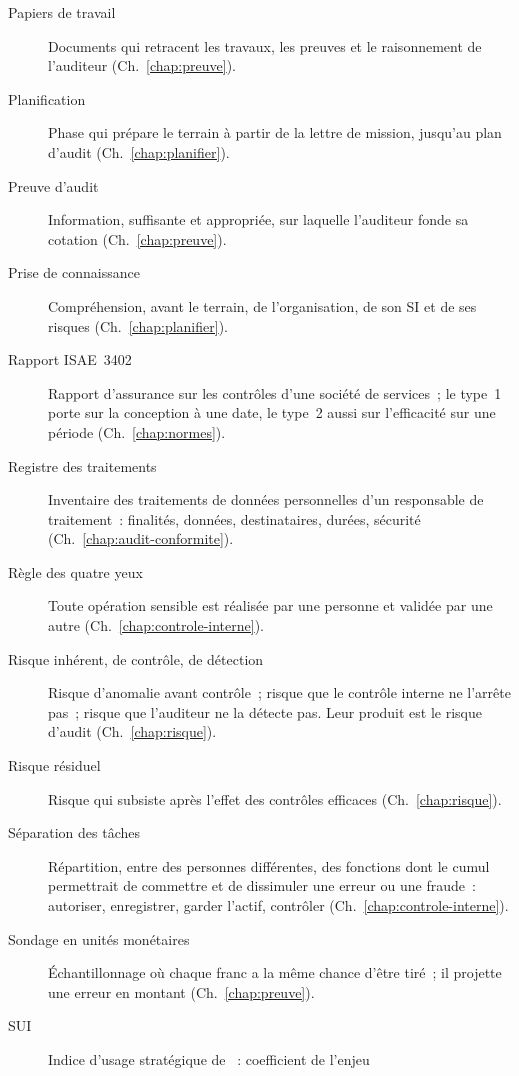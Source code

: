 \begin{description}
    \item[Papiers de travail] Documents qui retracent les travaux, les
          preuves et le raisonnement de l'auditeur (Ch.~\ref{chap:preuve}).
    \item[Planification] Phase qui prépare le terrain à partir de la lettre
          de mission, jusqu'au plan d'audit (Ch.~\ref{chap:planifier}).
    \item[Preuve d'audit] Information, suffisante et appropriée, sur
          laquelle l'auditeur fonde sa cotation (Ch.~\ref{chap:preuve}).
    \item[Prise de connaissance] Compréhension, avant le terrain, de
          l'organisation, de son SI et de ses risques (Ch.~\ref{chap:planifier}).
    \item[Rapport ISAE~3402] Rapport d'assurance sur les contrôles d'une
          société de services~; le type~1 porte sur la conception à une
          date, le type~2 aussi sur l'efficacité sur une période
          (Ch.~\ref{chap:normes}).
    \item[Registre des traitements] Inventaire des traitements de données
          personnelles d'un responsable de traitement~: finalités,
          données, destinataires, durées, sécurité
          (Ch.~\ref{chap:audit-conformite}).
    \item[Règle des quatre yeux] Toute opération sensible est réalisée par
          une personne et validée par une autre (Ch.~\ref{chap:controle-interne}).
    \item[Risque inhérent, de contrôle, de détection] Risque d'anomalie avant
          contrôle~; risque que le contrôle interne ne l'arrête pas~; risque
          que l'auditeur ne la détecte pas. Leur produit est le risque
          d'audit (Ch.~\ref{chap:risque}).
    \item[Risque résiduel] Risque qui subsiste après l'effet des contrôles
          efficaces (Ch.~\ref{chap:risque}).
    \item[Séparation des tâches] Répartition, entre des personnes
          différentes, des fonctions dont le cumul permettrait de commettre
          et de dissimuler une erreur ou une fraude~: autoriser,
          enregistrer, garder l'actif, contrôler
          (Ch.~\ref{chap:controle-interne}).
    \item[Sondage en unités monétaires] Échantillonnage où chaque franc a
          la même chance d'être tiré~; il projette une erreur en montant
          (Ch.~\ref{chap:preuve}).
    \item[SUI] Indice d'usage stratégique de \NEK{}~: coefficient de l'enjeu

\end{description}
